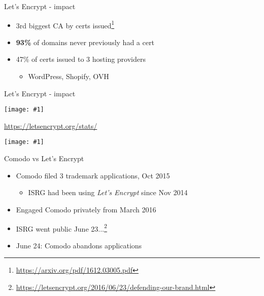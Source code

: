 \documentclass[ignorenonframetext,aspectratio=169]{beamer}
\makeatletter
\def\maxwidth{\ifdim\Gin@nat@width>\linewidth\linewidth\else\Gin@nat@width\fi}
\def\maxheight{\ifdim\Gin@nat@height>\textheight0.8\textheight\else\Gin@nat@height\fi}
\newcommand{\includegraphicsscaled}[1]{
    \texttt{[image: \#1]}
}
\makeatother
\begin{document}
\begin{frame}{Let's Encrypt - impact}

\begin{itemize}

\item 3rd biggest CA by certs
    issued\footnote{\url{https://arxiv.org/pdf/1612.03005.pdf}}

\item {\bf 93\%} of domains never previously had a cert

\item 47\% of certs issued to 3 hosting providers
  \begin{itemize}
  \item WordPress, Shopify, OVH
  \end{itemize}

\end{itemize}

\end{frame}

\begin{frame}{Let's Encrypt - impact}

\begin{center}
\includegraphicsscaled{https-pageloads.png}
\end{center}

\tiny

\url{https://letsencrypt.org/stats/}

\end{frame}

\begin{frame}[plain]

\begin{center}
\includegraphicsscaled{comodo-lets-encrypt.png}
\end{center}

\end{frame}

\begin{frame}{Comodo vs Let's Encrypt}

\begin{itemize}

\item<+-> Comodo filed 3 trademark applications, Oct 2015

  \begin{itemize}
  \item  ISRG had been using {\em Let's Encrypt} since Nov 2014
  \end{itemize}

\item  Engaged Comodo privately from March 2016

\item  ISRG went public
  June 23...\footnote{\url{https://letsencrypt.org/2016/06/23/defending-our-brand.html}}

\item<+->  June 24: Comodo abandons applications

\end{itemize}

\end{frame}
\end{document}

